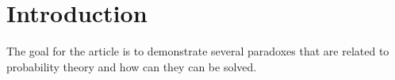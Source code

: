 \chapter*{Introduction}
The goal for the article is to demonstrate several paradoxes that are
related to probability theory and how can they can be solved.
